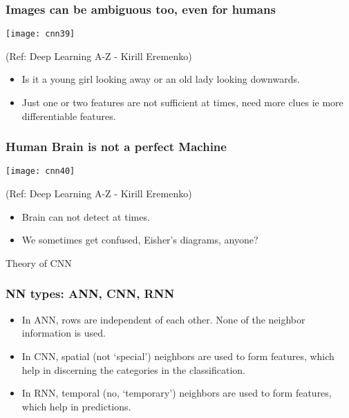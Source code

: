 \begin{frame}[fragile] \frametitle{Images can be ambiguous too, even for humans}

\begin{center}
\texttt{[image: cnn39]}

\tiny{(Ref: Deep Learning A-Z - Kirill Eremenko)}
\end{center}

\begin{itemize}
\item Is it a young girl looking away or an old lady looking downwards.
\item Just one or two features are not sufficient at times, need more clues ie more differentiable features.
\end{itemize}

\end{frame}

\begin{frame}[fragile] \frametitle{Human Brain is not a perfect Machine}

\begin{center}
\texttt{[image: cnn40]}

\tiny{(Ref: Deep Learning A-Z - Kirill Eremenko)}
\end{center}

\begin{itemize}
\item Brain can not detect at times.
\item We sometimes get confused, Eisher's diagrams, anyone?
\end{itemize}
\end{frame}



\begin{frame}
  \begin{center}
    {\Large Theory of CNN}
  \end{center}
\end{frame}

\begin{frame}[fragile] \frametitle{NN types: ANN, CNN, RNN}

\begin{itemize}
\item In ANN, rows are independent of each other. None of the neighbor information is used.
\item In CNN, spatial (not `special') neighbors are used to form features, which help in discerning the categories in the classification.
\item In RNN, temporal (no, `temporary') neighbors are used to form features, which help in predictions.
\end{itemize}


\end{frame}




